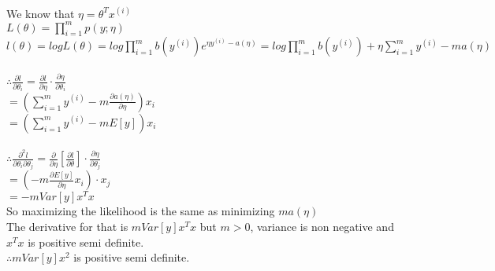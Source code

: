 \begin{answer}\\
We know that $\eta=\theta^T x^{(i)}$\\
$L(\theta)=\prod_{i=1}^{m} p(y;\eta)$\\
$l(\theta)=log L(\theta)=log \prod_{i=1}^{m}b(y^{(i)})e^{\eta y^{(i)}-a(\eta)}=log \prod_{i=1}^{m} b(y^{(i)}) + \eta \sum_{i=1}^{m}y^{(i)} -m a(\eta)$\\\\
$\therefore \frac{\partial l}{\partial \theta_i}=\frac{\partial l}{\partial \eta}\cdot \frac{\partial \eta}{\partial \theta_i}$\\
$=(\sum_{i=1}^{m}y^{(i)} - m \frac{\partial a(\eta)}{\partial \eta})x_i$\\
$=(\sum_{i=1}^{m}y^{(i)} - m E[y])x_i$\\\\
$\therefore \frac{\partial^2 l}{\partial \theta_i \partial \theta_j}=\frac{\partial}{\partial \eta}[\frac{\partial l}{\partial \theta}] \cdot \frac{\partial \eta}{\partial \theta_j}$\\
$=(-m \frac{\partial E[y]}{\partial \eta}x_i)\cdot x_j$\\
$=-m Var[y] x^Tx$\\
So maximizing the likelihood is the same as minimizing $m a(\eta)$\\
The derivative for that is $m Var[y] x^Tx$ but $m >0$, variance is non negative and $x^Tx$ is positive semi definite.\\
$\therefore m Var[y] x^2$ is positive semi definite.
\end{answer}
